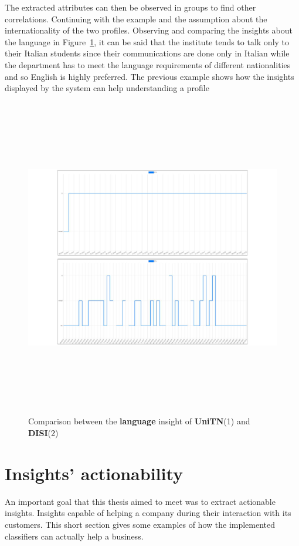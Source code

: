 The extracted attributes can then be observed in groups to find other correlations. Continuing with the example and the assumption about the internationality of the two profiles.
Observing and comparing the insights about the language in Figure~\ref{fig:langComp}, it can be said that the institute tends to talk only to their Italian students since their communications are done only in Italian while the department has to meet the language requirements of different nationalities and so English is highly preferred.
The previous example shows how the insights displayed by the system can help understanding a profile
\begin{figure}
    \centering
    \includegraphics[width=%
    1.0\textwidth,height=14cm,keepaspectratio]{img/langComparison.pdf}
    \caption{Comparison between the \textbf{language} insight of \textbf{UniTN}(1) and \textbf{DISI}(2)}
    \label{fig:langComp}
\end{figure}

\section{Insights' actionability}
\label{sec:InsAct}
An important goal that this thesis aimed to meet was to extract actionable insights. Insights capable of helping a company during their interaction with its customers.
This short section gives some examples of how the implemented classifiers can actually help a business.

